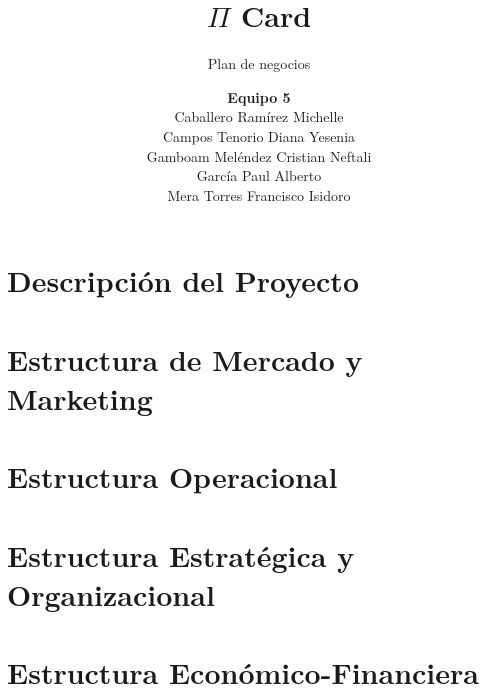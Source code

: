 \documentclass[11pt]{book}
\title{$\Pi$ Card}
\author{\textbf{Equipo 5}\\Caballero Ramírez Michelle\\Campos Tenorio Diana Yesenia\\Gamboam Meléndez Cristian Neftali\\García Paul Alberto\\Mera Torres Francisco Isidoro}
\subtitle{Plan de negocios}
\date{}
\begin{document}
	\maketitle
	\makeProjectCharter
	\makeFirmas
	\tableofcontents

\chapter{Descripción del Proyecto}


\chapter{Estructura de Mercado y Marketing}


\chapter{Estructura Operacional}


\chapter{Estructura Estratégica y Organizacional}


\chapter{Estructura Económico-Financiera}


	

	
\end{document}
